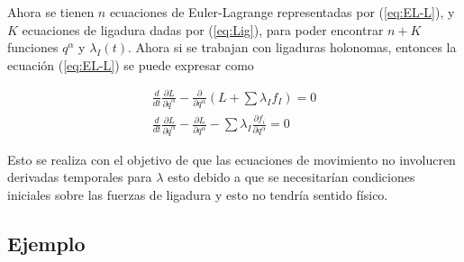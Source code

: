 Ahora se tienen $n$ ecuaciones de Euler-Lagrange representadas por (\ref*{eq:EL-L}), y $K$  ecuaciones de ligadura dadas por (\ref*{eq:Lig}), para poder encontrar $n + K$ funciones $q^{\alpha}$ y $\lambda_I(t)$. Ahora si se trabajan con ligaduras holonomas, entonces la ecuación (\ref*{eq:EL-L}) se puede expresar como

\begin{gather*}
    \frac{d}{dt}\frac{\partial L}{\partial \dot{q}^{\alpha}} - \frac{\partial}{\partial q^{\alpha}}\left(L + \sum \lambda_I f_I\right) = 0\\
    \frac{d}{dt}\frac{\partial L}{\partial \dot{q}^{\alpha}} - \frac{\partial L}{\partial q^{\alpha}} - \sum \lambda_I\frac{\partial f_i}{\partial q^{\alpha}}= 0
\end{gather*}

Esto se realiza con el objetivo de que las ecuaciones de movimiento no involucren derivadas temporales para $\lambda$ esto debido a que se necesitarían condiciones iniciales sobre las fuerzas de ligadura y esto no tendría sentido físico.

\subsection[short]{Ejemplo}







